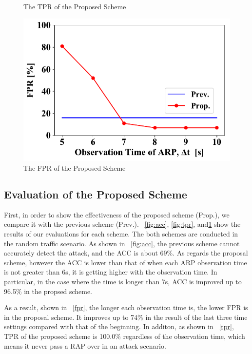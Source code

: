\documentclass[conference]{IEEEtran}
\begin{document}
\begin{figure}[ht]
\begin{minipage}{0.33\hsize}
\begin{center}
        \end{center}
        \caption{The TPR of the Proposed Scheme}
        \label{fig:tpr}
    \end{minipage}
    \begin{minipage}{0.33\hsize}
        \begin{center}
            \includegraphics[scale=0.4]{image/FPR.pdf}
        \end{center}
        \caption{The FPR of the Proposed Scheme}
        \label{fig:fpr}
    \end{minipage}

\end{figure}

\subsection{Evaluation of the Proposed Scheme}
First, in order to show the effectiveness of the proposed scheme (Prop.), we compare it with the previous scheme \cite{previous} (Prev.).
\figurename~\ref{fig:acc}, \ref{fig:tpr}, and\ref{fig:fpr} show the results of our evaluations for each scheme.
The both schemes are conducted in the random traffic scenario.
As shown in \figurename~\ref{fig:acc}, the previous scheme cannot accurately detect the attack, and the ACC is about 69\%.
As regards the proposal scheme, however the ACC is lower than that of \cite{previous} when each ARP observation time is not greater than 6s, it is getting higher with the observation time.
In particular, in the case where the time is longer than 7s, ACC is improved up to 96.5\% in the propsed scheme.

As a result, shown in \figurename~\ref{fpr}, the longer each observation time is, the lower FPR is in the proposal scheme.
It improves up to 74\% in the result of the last three time settings compared with that of the beginning.
In additon, as shown in \figurename~\ref{tpr}, TPR of the proposed scheme is 100.0\% regardless of the observation time, which means it never pass a RAP over in an attack scenario.
\end{document}
